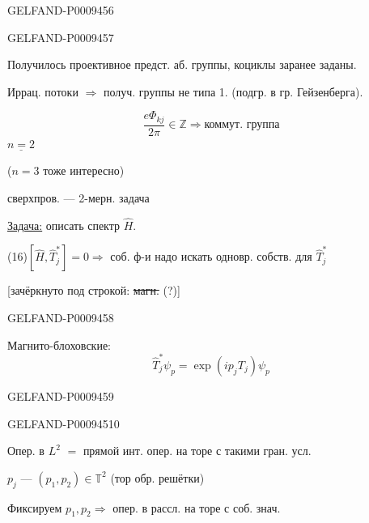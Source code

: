 \begin{GelfandAdjacentEvidence}{GELFAND-P000945}{6}

\end{GelfandAdjacentEvidence}
\begin{GelfandAdjacentEvidence}{GELFAND-P000945}{7}


Получилось проективное предст. аб. группы, коциклы заранее заданы.

Иррац. потоки $\Rightarrow$ получ. группы не типа 1. (подгр. в гр. Гейзенберга).

\begin{equation*}
 \frac{e\Phi_{kj}}{2\pi}\in\mathbb Z\Rightarrow\text{коммут. группа}
 \tag{15}
\end{equation*}
$\underline{n=2}$

($n=3$ тоже интересно)

сверхпров. --- 2-мерн. задача

\underline{Задача:} описать спектр $\hat H$.

(16)\quad $[\hat H,\hat T_j^*]=0\Rightarrow$ соб. ф-и надо искать одновр. собств. для $\hat T_j^*$

[зачёркнуто под строкой: \sout{магн.} (?)]
\end{GelfandAdjacentEvidence}
\begin{GelfandAdjacentEvidence}{GELFAND-P000945}{8}


Магнито-блоховские:
\begin{equation*}
 \hat T_j^*\psi_{p}=\exp(ip_jT_j)\psi_{p}
 \tag{17}
\end{equation*}
\end{GelfandAdjacentEvidence}
\begin{GelfandAdjacentEvidence}{GELFAND-P000945}{9}

\end{GelfandAdjacentEvidence}
\begin{GelfandAdjacentEvidence}{GELFAND-P000945}{10}


Опер. в $L^2$ $=$ прямой инт. опер. на торе с такими гран. усл.

$p_j$ --- \qquad $(p_1,p_2)\in\mathbb T^2$
\qquad (тор обр. решётки)

Фиксируем $p_1,p_2\Rightarrow$ опер. в рассл. на торе с соб. знач.
\end{GelfandAdjacentEvidence}


